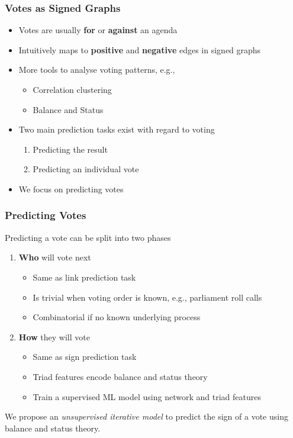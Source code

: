 \documentclass{beamer}
\begin{document}
\begin{frame}
    \frametitle{Votes as Signed Graphs}
    \begin{itemize}
        \item Votes are usually \textbf{for} or \textbf{against} an agenda
        \item Intuitively maps to \textbf{positive} and \textbf{negative} edges in signed graphs 
        \item More tools to analyse voting patterns, e.g.,
        \begin{itemize}
            \item Correlation clustering \cite{brito2020aBrazil,arinik2017signed}
            \item Balance and Status \cite{levorato2016brazilian,derr2018congressional}
        \end{itemize}
        \item Two main prediction tasks exist with regard to voting 
        \begin{enumerate}
            \item Predicting the result
            \item Predicting an individual vote
        \end{enumerate}
        \item We focus on predicting votes
    \end{itemize}
    
\end{frame}

\begin{frame}
    \frametitle{Predicting Votes}
    Predicting a vote can be split into two phases
    \begin{enumerate}
        \item \textbf{Who} will vote next
        \begin{itemize}
            \item Same as link prediction task
            \item Is trivial when voting order is known, e.g., parliament roll calls
            \item Combinatorial if no known underlying process
        \end{itemize}
        \item \textbf{How} they will vote 
        \begin{itemize}
            \item Same as sign prediction task
            \item Triad features encode balance and status theory
            \item Train a supervised ML model using network and triad features \cite{leskovec2010predicting,leskovec2010signed}
        \end{itemize}
    \end{enumerate}
    We propose an \textit{unsupervised iterative model} to predict the sign of a vote using balance and status theory.

\end{frame}
\end{document}
